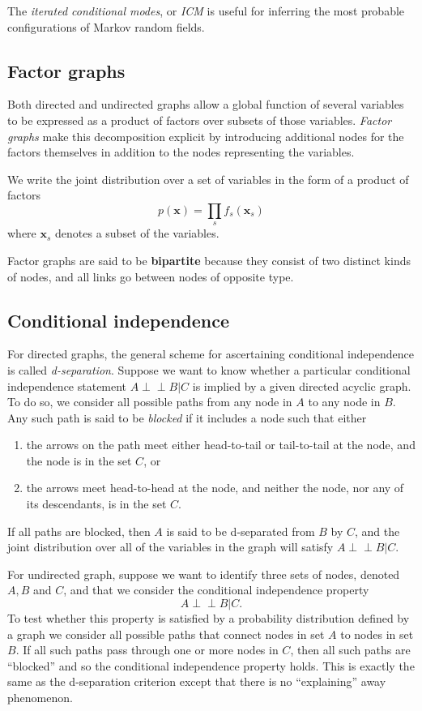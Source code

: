 \documentclass[a4paper]{report}
\def\ci{\perp\!\!\!\perp}
\renewcommand{\bf}{\mathbf}
\newcommand{\imp}[1]{{\color{blue}\textit{#1}}}
\begin{document}
The \imp{iterated conditional modes}, or \imp{ICM} is useful for inferring the most probable configurations of Markov random fields.
\subsection{Factor graphs}
Both directed and undirected graphs allow a global function of several variables to be expressed as a product of factors over subsets of those variables. \imp{Factor graphs} make this decomposition explicit by introducing additional nodes for the factors themselves in addition to the nodes representing the variables.

We write the joint distribution over a set of variables in the form of a product of factors
\begin{equation}
	p(\bf{x}) = \prod_{s} f_s(\bf{x}_s)
\end{equation}
where $\bf{x}_s$ denotes a subset of the variables.

Factor graphs are said to be \textbf{bipartite} because they consist of two distinct kinds of nodes, and all links go between nodes of opposite type.
\subsection{Conditional independence}
For directed graphs, the general scheme for ascertaining conditional independence is called \imp{d-separation}. Suppose we want to know whether a particular conditional independence statement $A \ci B|C$ is implied by a given directed acyclic graph. To do so, we consider all possible paths from any node in $A$ to any node in $B$. Any such path is said to be \imp{blocked} if it includes a node such that either
\begin{enumerate}
	\item the arrows on the path meet either head-to-tail or tail-to-tail at the node, and the node is in the set $C$, or
	\item the arrows meet head-to-head at the node, and neither the node, nor any of its descendants, is in the set $C$.
\end{enumerate}
If all paths are blocked, then $A$ is said to be d-separated from $B$ by $C$, and the joint distribution over all of the variables in the graph will satisfy $A\ci B|C$.

For undirected graph, suppose we want to identify three sets of nodes, denoted $A,B$ and $C$, and that we consider the conditional independence property
\begin{equation}
	A \ci B|C.
\end{equation}
To test whether this property is satisfied by a probability distribution defined by a graph we consider all possible paths that connect nodes in set $A$ to nodes in set $B$. If all such paths pass through one or more nodes in $C$, then all such paths are ``blocked'' and so the conditional independence property holds. This is exactly the same as the d-separation criterion except that there is no ``explaining'' away phenomenon.
\end{document}
